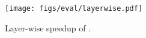 \begin{figure}[htbp]
    \centering
    \texttt{[image: figs/eval/layerwise.pdf]}
    \caption{Layer-wise speedup of \xxx.}
    \label{fig:layerwise-speedup}
\end{figure}
